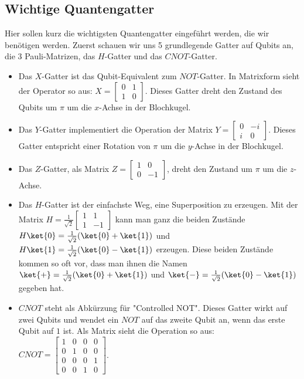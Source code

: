 \subsection{Wichtige Quantengatter}
Hier sollen kurz die wichtigsten Quantengatter eingeführt werden, die wir benötigen werden. Zuerst schauen wir uns 5 grundlegende Gatter auf Qubits an, die 3 Pauli-Matrizen, das $H$-Gatter und das $CNOT$-Gatter.
\begin{itemize}
    \item Das $X$-Gatter ist das Qubit-Equivalent zum $NOT$-Gatter. In Matrixform sieht der Operator so aus: $ X = \begin{bmatrix}0 & 1 \\ 1 & 0\end{bmatrix}$. Dieses Gatter dreht den Zustand des Qubits um $\pi$ um die $x$-Achse in der Blochkugel.
    \item Das $Y$-Gatter implementiert die Operation der Matrix $Y = \begin{bmatrix}0 & -i \\ i & 0\end{bmatrix}$. Dieses Gatter entspricht einer Rotation von $\pi$ um die $y$-Achse in der Blochkugel.
    \item Das $Z$-Gatter, als Matrix $Z = \begin{bmatrix}1 & 0 \\ 0 & -1\end{bmatrix}$, dreht den Zustand um $\pi$ um die $z$-Achse.
    \item Das $H$-Gatter ist der einfachste Weg, eine Superposition zu erzeugen. Mit der Matrix $H = \frac{1}{\sqrt{2}}\begin{bmatrix}1 & 1 \\ 1 & -1\end{bmatrix}$ kann man ganz die beiden Zustände $H\ket{0} = \frac{1}{\sqrt{2}}(\ket{0} + \ket{1})$ und $H\ket{1} = \frac{1}{\sqrt{2}}(\ket{0} - \ket{1})$ erzeugen. Diese beiden Zustände kommen so oft vor, dass man ihnen die Namen $\ket{+} = \frac{1}{\sqrt{2}}(\ket{0} + \ket{1})$ und $\ket{-} = \frac{1}{\sqrt{2}}(\ket{0} - \ket{1})$ gegeben hat.
    \item $CNOT$ steht als Abkürzung für "Controlled NOT". Dieses Gatter wirkt auf zwei Qubits und wendet ein $NOT$ auf das zweite Qubit an, wenn das erste Qubit auf $1$ ist. Als Matrix sieht die Operation so aus: $CNOT = \begin{bmatrix}1 & 0 & 0 & 0 \\ 0 & 1 & 0 & 0 \\ 0 & 0 & 0 & 1 \\ 0 & 0 & 1 & 0\end{bmatrix}$.
\end{itemize}
